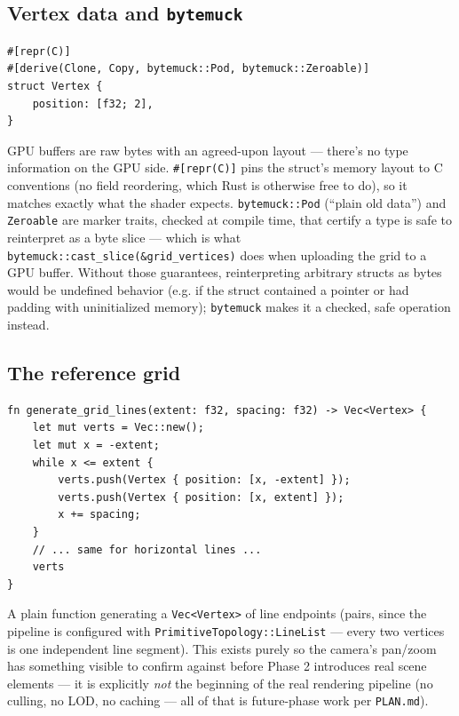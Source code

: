 \documentclass[11pt]{article}
\begin{document}
\subsection{Vertex data and \texttt{bytemuck}}
\begin{lstlisting}
#[repr(C)]
#[derive(Clone, Copy, bytemuck::Pod, bytemuck::Zeroable)]
struct Vertex {
    position: [f32; 2],
}
\end{lstlisting}
GPU buffers are raw bytes with an agreed-upon layout — there's no type information on the
GPU side. \texttt{\#[repr(C)]} pins the struct's memory layout to C conventions (no field
reordering, which Rust is otherwise free to do), so it matches exactly what the shader
expects. \texttt{bytemuck::Pod} (``plain old data'') and \texttt{Zeroable} are marker
traits, checked at compile time, that certify a type is safe to reinterpret as a byte
slice — which is what \texttt{bytemuck::cast\_slice(\&grid\_vertices)} does when uploading
the grid to a GPU buffer. Without those guarantees, reinterpreting arbitrary structs as
bytes would be undefined behavior (e.g. if the struct contained a pointer or had padding
with uninitialized memory); \texttt{bytemuck} makes it a checked, safe operation instead.

\subsection{The reference grid}
\begin{lstlisting}
fn generate_grid_lines(extent: f32, spacing: f32) -> Vec<Vertex> {
    let mut verts = Vec::new();
    let mut x = -extent;
    while x <= extent {
        verts.push(Vertex { position: [x, -extent] });
        verts.push(Vertex { position: [x, extent] });
        x += spacing;
    }
    // ... same for horizontal lines ...
    verts
}
\end{lstlisting}
A plain function generating a \texttt{Vec<Vertex>} of line endpoints (pairs, since the
pipeline is configured with \texttt{PrimitiveTopology::LineList} — every two vertices is
one independent line segment). This exists purely so the camera's pan/zoom has something
visible to confirm against before Phase 2 introduces real scene elements — it is
explicitly \emph{not} the beginning of the real rendering pipeline (no culling, no LOD, no
caching — all of that is future-phase work per \texttt{PLAN.md}).
\end{document}
